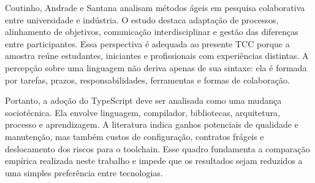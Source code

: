 Coutinho, Andrade e Santana \cite{coutinho2024agile} analisam métodos ágeis em pesquisa colaborativa entre universidade e indústria. O estudo destaca adaptação de processos, alinhamento de objetivos, comunicação interdisciplinar e gestão das diferenças entre participantes. Essa perspectiva é adequada ao presente TCC porque a amostra reúne estudantes, iniciantes e profissionais com experiências distintas. A percepção sobre uma linguagem não deriva apenas de sua sintaxe: ela é formada por tarefas, prazos, responsabilidades, ferramentas e formas de colaboração.

Portanto, a adoção do TypeScript deve ser analisada como uma mudança sociotécnica. Ela envolve linguagem, compilador, bibliotecas, arquitetura, processo e aprendizagem. A literatura indica ganhos potenciais de qualidade e manutenção, mas também custos de configuração, contratos frágeis e deslocamento dos riscos para o toolchain. Esse quadro fundamenta a comparação empírica realizada neste trabalho e impede que os resultados sejam reduzidos a uma simples preferência entre tecnologias.
